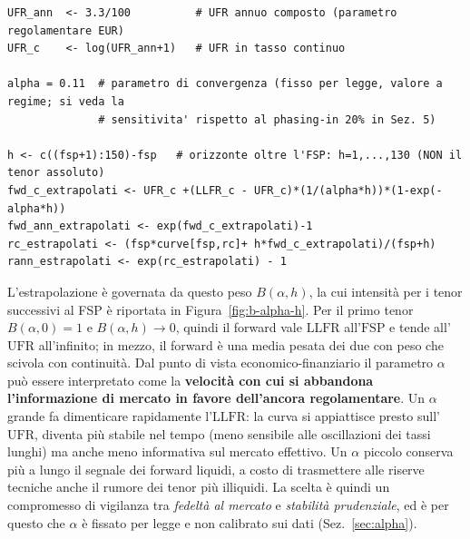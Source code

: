 \documentclass[11pt,a4paper]{article}
\theoremstyle{plain}
\theoremstyle{definition}
\theoremstyle{remark}
\newcommand{\UFR}{\mathrm{UFR}}
\newcommand{\LLFR}{\mathrm{LLFR}}
\newcommand{\FSP}{\mathrm{FSP}}
\begin{document}
\begin{codebox}
\begin{Verbatim}[fontsize=\small]
UFR_ann  <- 3.3/100          # UFR annuo composto (parametro regolamentare EUR)
UFR_c    <- log(UFR_ann+1)   # UFR in tasso continuo

alpha = 0.11  # parametro di convergenza (fisso per legge, valore a regime; si veda la
              # sensitivita' rispetto al phasing-in 20% in Sez. 5)

h <- c((fsp+1):150)-fsp   # orizzonte oltre l'FSP: h=1,...,130 (NON il tenor assoluto)
fwd_c_extrapolati <- UFR_c +(LLFR_c - UFR_c)*(1/(alpha*h))*(1-exp(-alpha*h))
fwd_ann_extrapolati <- exp(fwd_c_extrapolati)-1
rc_estrapolati <- (fsp*curve[fsp,rc]+ h*fwd_c_extrapolati)/(fsp+h)
rann_estrapolati <- exp(rc_estrapolati) - 1
\end{Verbatim}
\end{codebox}



L'estrapolazione \`e governata da questo peso $B(\alpha,h)$, la cui intensità per i tenor successivi al FSP è
riportata in Figura~\ref{fig:b-alpha-h}. Per il primo tenor $B(\alpha,0)=1$ e
$B(\alpha,h)\to0$, quindi il forward vale $\LLFR$ all'$\FSP$ e tende all'$\UFR$ all'infinito;
in mezzo, il forward \`e una media pesata dei due con peso che scivola con continuit\`a. 
Dal punto di vista economico-finanziario il parametro $\alpha$ può essere interpretato come la
\textbf{velocit\`a con cui si abbandona l'informazione di mercato in favore dell'ancora
regolamentare}. Un $\alpha$ grande fa dimenticare rapidamente l'$\LLFR$: la curva si appiattisce
presto sull'$\UFR$, diventa pi\`u stabile nel tempo (meno sensibile alle oscillazioni dei
tassi lunghi) ma anche meno informativa sul mercato effettivo. Un $\alpha$ piccolo conserva pi\`u
a lungo il segnale dei forward liquidi, a costo di trasmettere alle riserve tecniche anche il
rumore dei tenor pi\`u illiquidi. La scelta \`e quindi un compromesso di vigilanza tra
\emph{fedelt\`a al mercato} e \emph{stabilit\`a prudenziale}, ed \`e per questo che $\alpha$ \`e
fissato per legge e non calibrato sui dati (Sez.~\ref{sec:alpha}).
\end{document}

